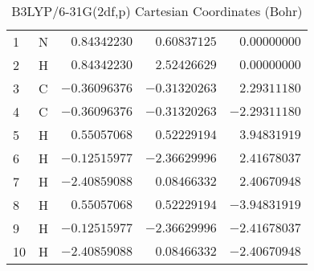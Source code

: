 \documentclass[10pt,oneside]{article}
\begin{document}
\begin{table}[h!]
\centering
\caption{B3LYP/6-31G(2df,p) Cartesian Coordinates (Bohr)}
\begin{tabular}{llrrr}
1  & N  & $ 0.84342230$ & $ 0.60837125$ & $ 0.00000000$ \\
2  & H  & $ 0.84342230$ & $ 2.52426629$ & $ 0.00000000$ \\
3  & C  & $-0.36096376$ & $-0.31320263$ & $ 2.29311180$ \\
4  & C  & $-0.36096376$ & $-0.31320263$ & $-2.29311180$ \\
5  & H  & $ 0.55057068$ & $ 0.52229194$ & $ 3.94831919$ \\
6  & H  & $-0.12515977$ & $-2.36629996$ & $ 2.41678037$ \\
7  & H  & $-2.40859088$ & $ 0.08466332$ & $ 2.40670948$ \\
8  & H  & $ 0.55057068$ & $ 0.52229194$ & $-3.94831919$ \\
9  & H  & $-0.12515977$ & $-2.36629996$ & $-2.41678037$ \\
10 & H  & $-2.40859088$ & $ 0.08466332$ & $-2.40670948$ \\
\end{tabular}
\end{table}

\clearpage
\end{document}
